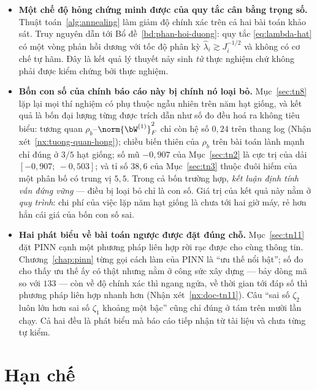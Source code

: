 \begin{itemize}[leftmargin=*]
\item \textbf{Một chế độ hỏng chứng minh được của quy tắc cân bằng trọng số.}
      Thuật toán~\ref{alg:annealing} làm giảm độ chính xác trên cả hai bài toán
      khảo sát. Truy nguyên dẫn tới Bổ đề~\ref{bd:phan-hoi-duong}: quy tắc
      \eqref{eq:lambda-hat} có một vòng phản hồi dương với tốc độ phân kỳ
      $\hat\lambda_i \gtrsim J_i^{-1/2}$ và không có cơ chế tự hãm. Đây là kết
      quả lý thuyết nảy sinh \emph{từ} thực nghiệm chứ không phải được kiểm chứng
      bởi thực nghiệm.
\item \textbf{Bốn con số của chính báo cáo này bị chính nó loại bỏ.}
      Mục~\ref{sec:tn8} lặp lại mọi thí nghiệm có phụ thuộc ngẫu nhiên trên năm
      hạt giống, và kết quả là bốn đại lượng từng được trích dẫn như số đo đều
      hoá ra không tiêu biểu: tương quan $\rho_b$--$\norm{\bW^{(1)}}_F^2$ chỉ còn
      hệ số $0{,}24$ trên thang log (Nhận xét~\ref{nx:tuong-quan-hong}); chiều
      biến thiên của $\rho_b$ trên bài toán lành mạnh chỉ đúng ở $3/5$ hạt giống;
      số mũ $-0{,}907$ của Mục~\ref{sec:tn2} là cực trị của dải
      $[-0{,}907;\ -0{,}503]$; và tỉ số $38{,}6$ của Mục~\ref{sec:tn3} thuộc đuôi
      hiếm của một phân bố có trung vị $5{,}5$. Trong cả bốn trường hợp,
      \emph{kết luận định tính vẫn đứng vững} --- điều bị loại bỏ chỉ là con số.
      Giá trị của kết quả này nằm ở \emph{quy trình}: chi phí của việc lặp năm
      hạt giống là chưa tới hai giờ máy, rẻ hơn hẳn cái giá của bốn con số sai.
\item \textbf{Hai phát biểu về bài toán ngược được đặt đúng chỗ.}
      Mục~\ref{sec:tn11} đặt PINN cạnh một phương pháp liên hợp rời rạc được cho
      cùng thông tin. Chương~\ref{chap:pinn} từng gọi cách làm của PINN là ``ưu
      thế nổi bật''; số đo cho thấy ưu thế ấy có thật nhưng nằm ở công sức xây
      dựng --- bảy dòng mã so với $133$ --- còn về độ chính xác thì ngang ngửa, về
      thời gian tới đáp số thì phương pháp liên hợp nhanh hơn
      (Nhận xét~\ref{nx:doc-tn11}). Câu ``sai số $\zeta_2$ luôn lớn hơn sai số
      $\zeta_1$ khoảng một bậc'' cũng chỉ đúng ở tám trên mười lần chạy. Cả hai
      đều là phát biểu mà báo cáo tiếp nhận từ tài liệu và chưa từng tự kiểm.
\end{itemize}

\section{Hạn chế}
\label{sec:han-che-cuoi}

